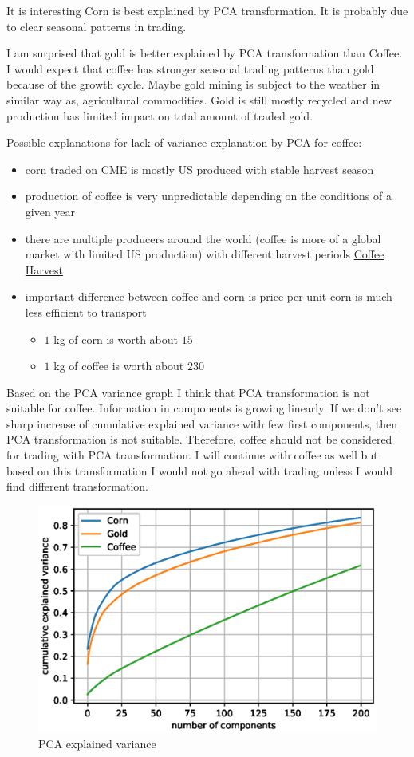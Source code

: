 \documentclass[final,2p]{elsarticle}
\begin{document}
It is interesting Corn is best explained by PCA transformation. It is probably due to clear seasonal patterns in trading.

I am surprised that gold is better explained by PCA transformation than Coffee. I would expect that coffee has stronger seasonal trading patterns than gold because of the growth cycle. Maybe gold mining is subject to the weather in similar way as, agricultural commodities. Gold is still mostly recycled and new production has limited impact on total amount of traded gold.

Possible explanations for lack of variance explanation by PCA for coffee:
\begin{itemize}
    \item corn traded on CME is mostly US produced with stable harvest season
    \item production of coffee is very unpredictable depending on the conditions of a given year
    \item there are multiple producers around the world (coffee is more of a global market with limited US production) with different harvest periods \href{https://driftaway.coffee/when-is-coffee-harvested/}{Coffee Harvest}
    \item important difference between coffee and corn is price per unit corn is much less efficient to transport
        \begin{itemize}
            \item $1$ kg of corn is worth about $15$\textcent
            \item $1$ kg of coffee is worth about $230$\textcent
        \end{itemize}
\end{itemize}
    
Based on the PCA variance graph I think that PCA transformation is not suitable for coffee. Information in components is growing linearly. If we don't see sharp increase of cumulative explained variance with few first components, then PCA transformation is not suitable. Therefore, coffee should not be considered for trading with PCA transformation. I will continue with coffee as well but based on this transformation I would not go ahead with trading unless I would find different transformation.
\begin{figure}[h]
    \centering
    \includegraphics{figures/pca.eps}
    \caption{PCA explained variance}
\end{figure}
\end{document}
